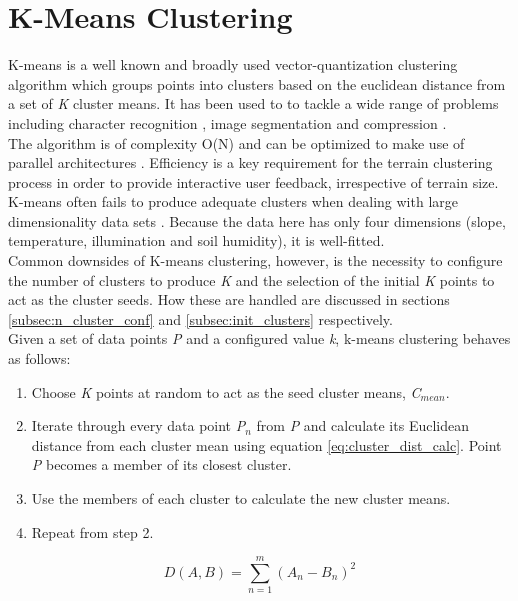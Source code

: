\section{K-Means Clustering} \label{sec:clustering}

K-means is a well known and broadly used vector-quantization clustering algorithm \cite{Jain2010} which groups points into clusters based on the euclidean distance from a set of \textit{K} cluster means. It has been used to to tackle a wide range of problems including character recognition \cite{Perrone2000}, image segmentation \cite{Bradley1998,Kanungo2002} and compression \cite{Kanungo2002}.\\
The algorithm is of complexity O(N) and can be optimized to make use of parallel architectures \cite{Xu2005}. Efficiency is a key requirement for the terrain clustering process in order to provide interactive user feedback, irrespective of terrain size.\\
K-means often fails to produce adequate clusters when dealing with large dimensionality data sets \cite{Sun2012}. Because the data here has only four dimensions (slope, temperature, illumination and soil humidity), it is well-fitted. \\
Common downsides of K-means clustering, however, is the necessity to configure the number of clusters to produce \textit{K} and the selection of the initial \textit{K} points to act as the cluster seeds. How these are handled are discussed in sections \ref{subsec:n_cluster_conf} and \ref{subsec:init_clusters} respectively.\\

Given a set of data points \textit{P} and a configured value \textit{k}, k-means clustering behaves as follows:
\begin{enumerate}
\item Choose \textit{K} points at random to act as the seed cluster means, \textit{C$_{mean}$}.
\item Iterate through every data point \textit{P$_{n}$} from \textit{P} and calculate its Euclidean distance from each cluster mean using equation \ref{eq:cluster_dist_calc}. Point \textit{P} becomes a member of its closest cluster. 
\item Use the members of each cluster to calculate the new cluster means. 
\item Repeat from step 2. 
\end{enumerate}

\begin{equation} \label{eq:cluster_dist_calc}
D(A,B) = \sum_{n=1}^{m} (A_{n} - B_{n}) ^{2}
\end{equation}

